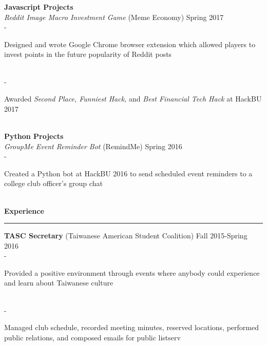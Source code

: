 \documentclass[11pt]{article}
\newcommand{\Hrule}{\vspace{1mm}\hrule\vspace{1mm}}
\begin{document}
        \indent \small\textbf{Javascript Projects}\\
            \indent\indent \small\textit{Reddit Image Macro Investment Game}\small{ (Meme Economy)} \hfill \small{Spring 2017}\indent\vspace{0.5mm}\\
                \indent\indent\indent - \begin{minipage}{\dimexpr\textwidth-7cm}
                    \small{ Designed and wrote Google Chrome browser extension which allowed players to invest points in the future popularity of Reddit posts}
                \end{minipage}\vspace{1mm}\\
                \indent\indent\indent - \begin{minipage}{\dimexpr\textwidth-7cm}
                    \small{ Awarded \textit{Second Place, Funniest Hack,} and \textit{Best Financial Tech Hack} at HackBU 2017}
                \end{minipage}\vspace{2mm}\\
        \indent \small\textbf{Python Projects}\\
            \indent\indent \small\textit{GroupMe Event Reminder Bot}\small{ (RemindMe)} \hfill \small{Spring 2016}\indent\vspace{0.5mm}\\
                \indent\indent\indent - \begin{minipage}{\dimexpr\textwidth-7cm}
                    \small{ Created a Python bot at HackBU 2016 to send scheduled event reminders to a college club officer's group chat}
                \end{minipage}\vspace{1mm}\\
    \noindent\large\textbf{Experience}
    \Hrule
        \indent\small{\textbf{TASC Secretary} (Taiwanese American Student Coalition)} \hfill \small{Fall 2015-Spring 2016}\indent\vspace{0.5mm}\\
            \indent\indent - \begin{minipage}{\dimexpr\textwidth-7cm}
                \small{ Provided a positive environment through events where anybody could experience and learn about Taiwanese culture}
            \end{minipage}\vspace{1mm}\\
            \indent\indent - \begin{minipage}{\dimexpr\textwidth-7cm}
                \small{ Managed club schedule, recorded meeting minutes, reserved locations, performed public relations, and composed emails for public listserv}
            \end{minipage}\vspace{1mm}\\
\end{document}
